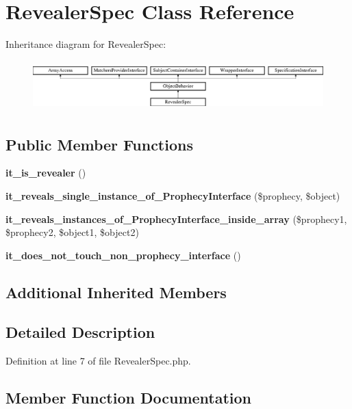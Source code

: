 \section{Revealer\+Spec Class Reference}
\label{classspec_1_1_prophecy_1_1_prophecy_1_1_revealer_spec}
Inheritance diagram for Revealer\+Spec\+:\begin{figure}[H]
\begin{center}
\leavevmode
\includegraphics[height=1.953488cm]{classspec_1_1_prophecy_1_1_prophecy_1_1_revealer_spec}
\end{center}
\end{figure}
\subsection*{Public Member Functions}
\begin{DoxyCompactItemize}
\item 
{\bf it\+\_\+is\+\_\+revealer} ()
\item 
{\bf it\+\_\+reveals\+\_\+single\+\_\+instance\+\_\+of\+\_\+\+Prophecy\+Interface} (\$prophecy, \$object)
\item 
{\bf it\+\_\+reveals\+\_\+instances\+\_\+of\+\_\+\+Prophecy\+Interface\+\_\+inside\+\_\+array} (\$prophecy1, \$prophecy2, \$object1, \$object2)
\item 
{\bf it\+\_\+does\+\_\+not\+\_\+touch\+\_\+non\+\_\+prophecy\+\_\+interface} ()
\end{DoxyCompactItemize}
\subsection*{Additional Inherited Members}


\subsection{Detailed Description}


Definition at line 7 of file Revealer\+Spec.\+php.



\subsection{Member Function Documentation}
